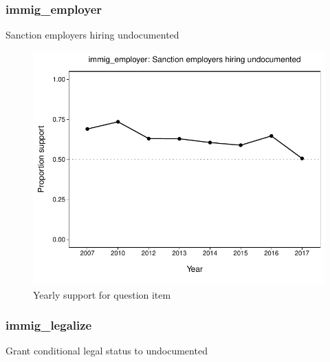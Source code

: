 \documentclass[
  12pt]{article}
\begin{document}
\hypertarget{immig_employer}{%
\subsubsection{immig\_employer}\label{immig_employer}}

Sanction employers hiring undocumented

\begin{figure}

{\centering \includegraphics{error-checking_files/figure-latex/unnamed-chunk-3-22} 

}

\caption{Yearly support for question item}\label{fig:unnamed-chunk-3-22}
\end{figure}

\hypertarget{immig_legalize}{%
\subsubsection{immig\_legalize}\label{immig_legalize}}

Grant conditional legal status to undocumented
\end{document}
